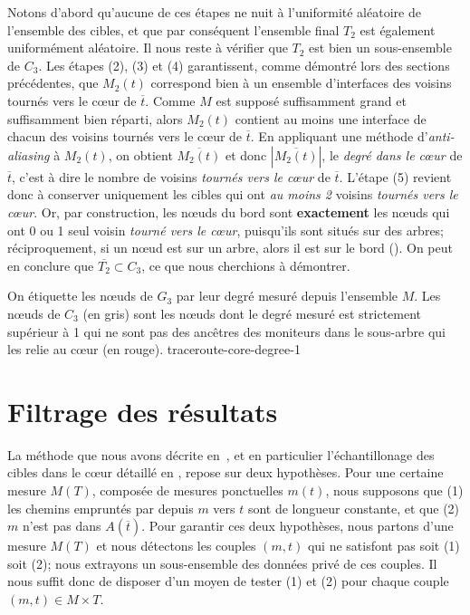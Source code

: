 Notons d'abord qu'aucune de ces étapes ne nuit à l'uniformité aléatoire de
l'ensemble des cibles, et que par conséquent l'ensemble final $T_2$ est
également uniformément aléatoire. Il nous reste à vérifier que $T_2$ est bien un
sous-ensemble de $C_3$. Les étapes (2), (3) et (4) garantissent, comme démontré
lors des sections précédentes, que $M_2(t)$ correspond bien à un ensemble
d'interfaces des voisins tournés vers le cœur de $\overline{t}$. Comme $M$ est
supposé suffisamment grand et suffisamment bien réparti, alors $M_2(t)$ contient
au moins une interface de chacun des voisins tournés vers le cœur de
$\overline{t}$. En appliquant une méthode d'{\em anti-aliasing} à $M_2(t)$, on
obtient $\overline{M_2(t)}$ et donc $|\overline{M_2(t)}|$, le {\em degré dans le
cœur} de $\overline{t}$, c'est à dire le nombre de voisins {\em tournés vers le
cœur} de $\overline{t}$. L'étape (5) revient donc à conserver uniquement les
cibles qui ont {\em au moins 2} voisins {\em tournés vers le cœur}. Or, par
construction, les n\oe{}uds du bord sont {\bf exactement} les n\oe{}uds qui ont 0 ou 1
seul voisin {\em tourné vers le cœur}, puisqu'ils sont situés sur des arbres;
réciproquement, si un n\oe{}ud est sur un arbre, alors il est sur le bord
(). On peut en conclure que $\overline{T_2}
\subset C_3$, ce que nous cherchions à démontrer.

 {On étiquette les n\oe{}uds de $G_3$ par leur degré mesuré depuis
l'ensemble $M$. Les n\oe{}uds de $C_3$ (en gris) sont les n\oe{}uds dont le degré
mesuré est strictement supérieur à 1 qui ne sont pas des ancêtres des moniteurs
dans le sous-arbre qui les relie au c\oe{}ur (en rouge).}
{traceroute-core-degree-1}

\section{Filtrage des résultats}
\label{sec:traceroute-filtering}

La méthode que nous avons décrite en~, et en
particulier l'échantillonage des cibles dans le cœur
détaillé en , repose sur deux hypothèses. Pour une
certaine mesure $M(T)$, composée de mesures ponctuelles $m(t)$, nous supposons que (1)
les chemins empruntés par \traceroute depuis $m$ vers $t$ sont de longueur
constante, et que (2) $m$ n'est pas dans $A(\overline{t})$. Pour
garantir ces deux hypothèses, nous partons d'une mesure $M(T)$ et nous détectons
les couples $(m, t)$ qui ne satisfont pas soit (1) soit (2); nous extrayons un
sous-ensemble des données privé de ces couples. Il nous suffit donc de disposer
d'un moyen de tester (1) et (2) pour chaque couple $(m, t) \in M \times T$.


